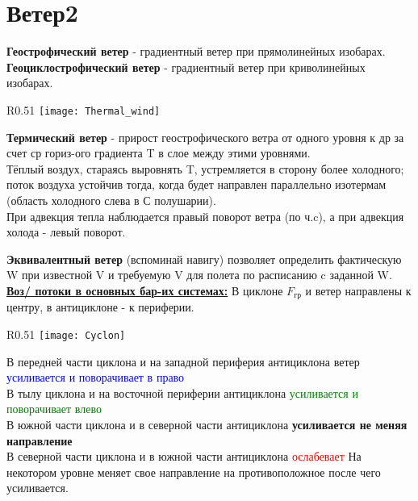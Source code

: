 
\section{Ветер2} 
\textbf{Геострофический ветер} - градиентный ветер при прямолинейных изобарах.\\
\textbf{Геоциклострофический ветер} - градиентный ветер при криволинейных изобарах.\\

\begin{wrapfigure}[8]{R}{0.51\linewidth}
	\vspace{-5ex}
	\texttt{[image: Thermal\_wind]}
\end{wrapfigure}

\textbf{Термический ветер} - прирост геострофического ветра от одного уровня к др за счет ср гориз-ого градиента T в слое между этими уровнями.\\
Тёплый воздух, стараясь выровнять T, устремляется в сторону более холодного; поток воздуха устойчив тогда, когда будет направлен параллельно изотермам (область холодного слева в С полушарии).\\
При адвекция тепла наблюдается правый поворот ветра (по ч.c), а при адвекция холода - левый поворот.

\par\textbf{Эквивалентный ветер} (вспоминай навигу) позволяет определить фактическую W при известной V и требуемую V для полета по расписанию c заданной W.\\

\underline{\textbf{Воз/ потоки в основных бар-их системах:}}
В циклоне $F_{\text{гр}}$ и ветер направлены к центру, в антициклоне - к периферии.

\begin{wrapfigure}[7]{R}{0.51\linewidth}
	\vspace{-8ex}
	\texttt{[image: Cyclon]}
\end{wrapfigure}

В передней части циклона и на западной периферия антициклона ветер \textcolor{blue}{усиливается и поворачивает в право} \\
В тылу циклона и на восточной периферии антициклона \textcolor{Green}{усиливается и поворачивает влево}\\
В южной части циклона и в северной части антициклона \textbf{усиливается не меняя направление}\\
В северной части циклона и в южной части антициклона \textcolor{red}{ослабевает} На некотором уровне меняет свое направление на противоположное после чего усиливается.
 
